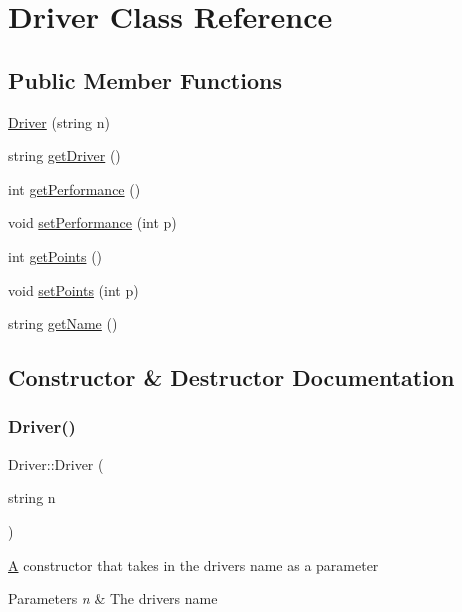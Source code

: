 \hypertarget{classDriver}{}\section{Driver Class Reference}
\label{classDriver}
\subsection*{Public Member Functions}
\begin{DoxyCompactItemize}
\item 
\hyperlink{classDriver_a734f2178611130af5034263ab26f73ea}{Driver} (string n)
\item 
string \hyperlink{classDriver_abd055f2390a62d8347115e6616ce5aa3}{get\+Driver} ()
\item 
int \hyperlink{classDriver_a96ea452112b25946d7a68005e75bd125}{get\+Performance} ()
\item 
void \hyperlink{classDriver_aa8e4524d765561c16d2bf6072e963e83}{set\+Performance} (int p)
\item 
int \hyperlink{classDriver_a7d527bc5a262fcba16f239103969bbc3}{get\+Points} ()
\item 
void \hyperlink{classDriver_a10b1b27d8d99ed19304b69727f0a0504}{set\+Points} (int p)
\item 
string \hyperlink{classDriver_ae85810c10f8aa5f9db23633b5c86edcf}{get\+Name} ()
\end{DoxyCompactItemize}


\subsection{Constructor \& Destructor Documentation}
\mbox{\label{classDriver_a734f2178611130af5034263ab26f73ea}} 
\subsubsection{\texorpdfstring{Driver()}{Driver()}}
{\footnotesize\ttfamily Driver\+::\+Driver (\begin{DoxyParamCaption}\item[{string}]{n }\end{DoxyParamCaption})}

\hyperlink{classA}{A} constructor that takes in the drivers name as a parameter 
\begin{DoxyParams}{Parameters}
{\em n} & The drivers name \\
\hline
\end{DoxyParams}


